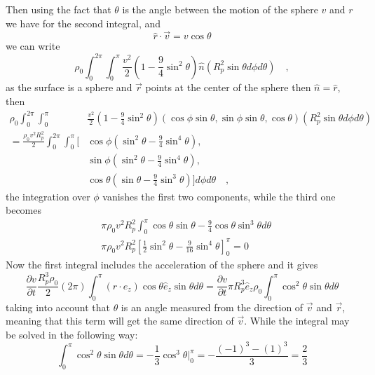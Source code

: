Then using the fact that $\theta$ is the angle between the motion of the sphere $v$ and $r$ we have for the second integral, and
\begin{equation}
    \hat{r}\cdot\vec{v} = v\cos\theta
\end{equation}
we can write
\begin{equation}
    \rho_0\int_{0}^{2\pi}\int_{0}^{\pi} \frac{v^2}{2}\left(1-\frac{9}{4}\sin^2\theta\right)\hat n (R_p^2\sin\theta d\phi d\theta)\quad,
\end{equation}
as the surface is a sphere and $\vec r$ points at the center of the sphere then $\hat n = \hat r$, then
\begin{align}
    \rho_0\int_{0}^{2\pi}\int_{0}^{\pi}&\frac{v^2}{2}\left(1-\frac{9}{4}\sin^2\theta\right)(\cos\phi\sin\theta, \sin\phi\sin\theta, \cos\theta) (R_p^2\sin\theta d\phi d\theta)\nonumber\\
    = \frac{\rho_0v^2R_p^2}{2}\int_{0}^{2\pi}\int_{0}^{\pi}\bigg[&\cos\phi\left(\sin^2\theta-\frac{9}{4}\sin^4\theta\right), \nonumber \\
    &\sin\phi\left(\sin^2\theta-\frac{9}{4}\sin^4\theta\right), \nonumber\\
    &\cos\theta\left(\sin\theta-\frac{9}{4}\sin^3\theta\right)\bigg] d\phi d\theta\quad,\label{intro.arf.eq:second_integral}
\end{align}
the integration over $\phi$ vanishes the first two components, while the third one becomes
\begin{align}
    &\pi \rho_0v^2R_p^2\int_{0}^{\pi}\cos\theta\sin\theta - \frac{9}{4}\cos\theta\sin^3\theta d\theta \nonumber\\ 
    &\pi \rho_0v^2R_p^2\left[\frac{1}{2}\sin^2\theta - \frac{9}{16}\sin^4\theta\right]_0^{\pi} = 0
\end{align}
Now the first integral includes the acceleration of the sphere and it gives
\begin{equation}\label{intro.arf.eq:first_integral}
    \frac{\partial v}{\partial t}\frac{R_p^3\rho_0}{2}(2\pi)\int_{0}^{\pi}(\hat r\cdot\hat e_{z})\cos\theta\hat e_{z}\sin\theta d\theta = \frac{\partial v}{\partial t}\pi R_p^3\hat e_z\rho_0\int_{0}^{\pi}\cos^2\theta\sin\theta d\theta
\end{equation}
taking into account that $\theta$ is an angle measured from the direction of $\vec v$ and $\vec r$, meaning that this term will get the same direction of $\vec v$. While the integral may be solved in the following way:
\begin{equation}
    \int_{0}^{\pi}\cos^2\theta\sin\theta d\theta = -\frac{1}{3}\cos^3\theta\bigg|_0^{\pi} = -\frac{(-1)^3 - (1)^3}{3} = \frac{2}{3}
\end{equation}
